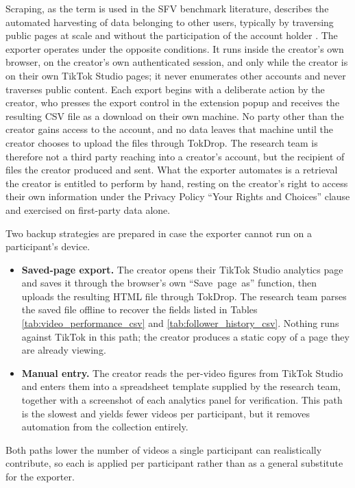 Scraping, as the term is used in the SFV benchmark literature, describes the automated harvesting of data belonging to other users, typically by traversing public pages at scale and without the participation of the account holder \cite{li2025vquala}. The exporter operates under the opposite conditions. It runs inside the creator's own browser, on the creator's own authenticated session, and only while the creator is on their own TikTok Studio pages; it never enumerates other accounts and never traverses public content. Each export begins with a deliberate action by the creator, who presses the export control in the extension popup and receives the resulting CSV file as a download on their own machine. No party other than the creator gains access to the account, and no data leaves that machine until the creator chooses to upload the files through TokDrop. The research team is therefore not a third party reaching into a creator's account, but the recipient of files the creator produced and sent. What the exporter automates is a retrieval the creator is entitled to perform by hand, resting on the creator's right to access their own information under the Privacy Policy ``Your Rights and Choices'' clause \cite{tiktok_privacy_2026} and exercised on first-party data alone.

Two backup strategies are prepared in case the exporter cannot run on a participant's device.

\begin{itemize}
    \item \textbf{Saved-page export.} The creator opens their TikTok Studio analytics page and saves it through the browser's own \mbox{``Save page as''} function, then uploads the resulting HTML file through TokDrop. The research team parses the saved file offline to recover the fields listed in Tables \mbox{\ref{tab:video_performance_csv}} and \mbox{\ref{tab:follower_history_csv}}. Nothing runs against TikTok in this path; the creator produces a static copy of a page they are already viewing.

    \item \textbf{Manual entry.} The creator reads the per-video figures from TikTok Studio and enters them into a spreadsheet template supplied by the research team, together with a screenshot of each analytics panel for verification. This path is the slowest and yields fewer videos per participant, but it removes automation from the collection entirely.
\end{itemize}

Both paths lower the number of videos a single participant can realistically contribute, so each is applied per participant rather than as a general substitute for the exporter.


